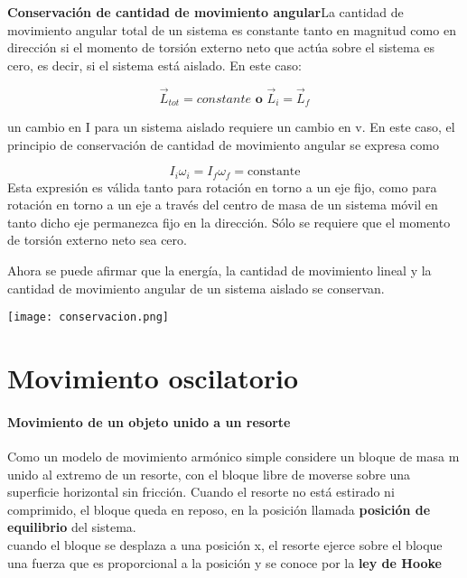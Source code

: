 \documentclass[10pt]{article}
\begin{document}
\textbf{Conservación de cantidad de movimiento angular}La cantidad de movimiento angular total de un sistema es constante tanto en magnitud como en dirección si el momento de torsión externo neto que actúa sobre el sistema es cero, es decir, si el sistema está aislado. En este caso:

\begin{equation*}
	\overrightarrow{L}_{tot} = constante \textbf{ o } \overrightarrow{L}_i = \overrightarrow{L}_f 
\end{equation*}

un cambio en I para un sistema aislado requiere un cambio en v. En este caso, el principio de conservación de cantidad de movimiento angular se expresa como

\begin{equation*}
	I_i \omega_i = I_f \omega_f = \text{constante}
\end{equation*}
Esta expresión es válida tanto para rotación en torno a un eje fijo, como para rotación en torno a un eje a través del centro de masa de un sistema móvil en tanto dicho eje permanezca fijo en la dirección. Sólo se requiere que el momento de torsión externo neto sea cero.\\
\linebreak

Ahora se puede afirmar que la energía, la cantidad de movimiento lineal y la cantidad de movimiento angular de un sistema aislado se conservan.

\texttt{[image: conservacion.png]}\\

\section{Movimiento oscilatorio}

\paragraph{Movimiento de un objeto unido a un resorte}

Como un modelo de movimiento armónico simple considere un bloque de masa m unido al extremo de un resorte, con el bloque libre de moverse sobre una superficie horizontal sin fricción. Cuando el resorte no está estirado ni comprimido, el bloque
queda en reposo, en la posición llamada \textbf{posición de equilibrio} del sistema.\\
cuando el bloque se desplaza a una posición x, el resorte ejerce sobre el bloque una fuerza que es proporcional a la posición y se conoce por la \textbf{ley de Hooke}
\end{document}

